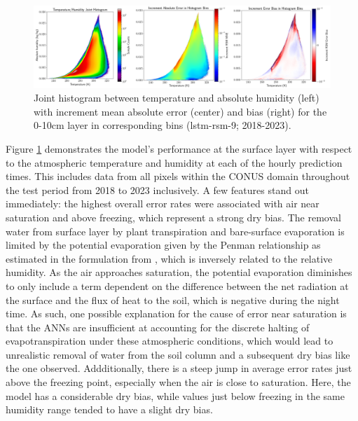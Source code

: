 \begin{figure}[h!]
    \centering

    \includegraphics[width=.99\linewidth,draft=false]{figures/seq-eval_lstm-rsm-9/eval-grid_full_lstm-rsm-9_rsm-10_hist-humidity-temp_all-3.png}

    \caption{Joint histogram between temperature and absolute humidity (left) with increment mean absolute error (center) and bias (right) for the 0-10cm layer in corresponding bins (lstm-rsm-9; 2018-2023).}
    \label{bulk-eval_humidity-temp}
\end{figure}

Figure \ref{bulk-eval_humidity-temp} demonstrates the model's performance at the surface layer with respect to the atmospheric temperature and humidity at each of the hourly prediction times. This includes data from all pixels within the CONUS domain throughout the test period from 2018 to 2023 inclusively. A few features stand out immediately: the highest overall error rates were associated with air near saturation and above freezing, which represent a strong dry bias. The removal water from surface layer by plant transpiration and bare-surface evaporation is limited by the potential evaporation given by the Penman relationship as estimated in the formulation from \citep{mahrt_influence_1984}, which is inversely related to the relative humidity. As the air approaches saturation, the potential evaporation diminishes to only include a term dependent on the difference between the net radiation at the surface and the flux of heat to the soil, which is negative during the night time. As such, one possible explanation for the cause of error near saturation is that the ANNs are insufficient at accounting for the discrete halting of evapotranspiration under these atmospheric conditions, which would lead to unrealistic removal of water from the soil column and a subsequent dry bias like the one observed. Addditionally, there is a steep jump in average error rates just above the freezing point, especially when the air is close to saturation. Here, the model has a considerable dry bias, while values just below freezing in the same humidity range tended to have a slight dry bias.

